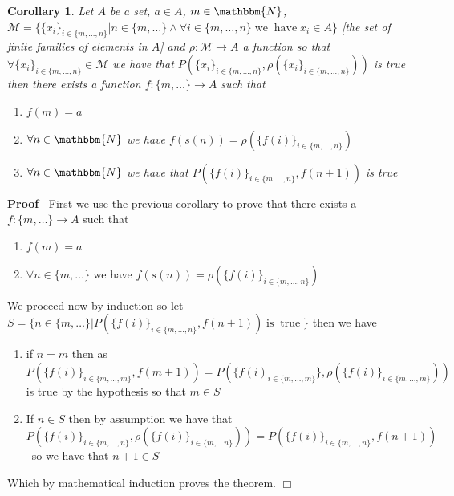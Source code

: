 \documentclass{book}
\newcommand{\tmop}[1]{\ensuremath{\operatorname{#1}}}
\newenvironment{proof}{\noindent\textbf{Proof\ }}{\hspace*{\fill}$\Box$\medskip}
\newtheorem{corollary}{Corollary}
\begin{document}
{{\begin{corollary}
  \label{recursion restricted sequence}Let $A$ be a set, $a \in A$, $m \in
  \mathbbm{N}$, $\mathcal{M}= \{ \{ x_i \}_{i \in \{ m, \ldots, n \}} |n \in
  \{ m, \ldots \} \wedge \forall i \in \{ m, \ldots, n \} \tmop{we}
  \tmop{have} x_i \in A \}$ [the set of finite families of elements in $A$]
  and $\rho : \mathcal{M} \rightarrow A$ a function so that $\forall \{ x_i
  \}_{i \in \{ m, \ldots, n \}} \in \mathcal{M}$ we have that $P (\{ x_i \}_{i
  \in \{ m, \ldots, n \}}, \rho (\{ x_i \}_{i \in \{ m, \ldots, n \}}))$ is
  true then there exists a function $f : \{ m, \ldots \} \rightarrow A$ such
  that
  \begin{enumerate}
    \item $f (m) = a$
    
    \item $\forall n \in \mathbbm{N}$ we have $f (s (n)) = \rho (\{ f (i)
    \}_{i \in \{ m, \ldots, n \}})$
    
    \item $\forall n \in \mathbbm{N}$ we have that $P (\{ f (i) \}_{i \in \{
    m, \ldots, n \}}, f (n + 1))$ is true
  \end{enumerate}
\end{corollary}

\begin{proof}
  First we use the previous corollary to prove that there exists a $f : \{ m,
  \ldots \} \rightarrow A$ such that
  \begin{enumerate}
    \item $f (m) = a$
    
    \item $\forall n \in \{ m, \ldots \}$ we have $f (s (n)) = \rho (\{ f (i)
    \}_{i \in \{ m, \ldots, n \}})$
  \end{enumerate}
  We proceed now by induction so let $S = \{ n \in \{ m, \ldots \} |P (\{ f
  (i) \}_{i \in \{ m, \ldots, n \}}, f (n + 1)) \tmop{is} \tmop{true} \}$ then
  we have
  \begin{enumerate}
    \item if $n = m$ then as $P (\{ f (i) \}_{i \in \{ m, \ldots, m \}}, f (m
    + 1)) = P (\{ f (i)_{i \in \{ m, \ldots, m \}} \}, \rho (\{ f (i) \}_{i
    \in \{ m, \ldots, m \}}))$ is true by the hypothesis so that $m \in S$
    
    \item If $n \in S$ then by assumption we have that $P (\{ f (i) \}_{i \in
    \{ m, \ldots, n \}}, \rho (\{ f (i) \}_{i \in \{ m, \ldots n \}})) = P (\{
    f (i) \}_{i \in \{ m, \ldots, n \}}, f (n + 1))$ \ so we have that $n + 1
    \in S$
  \end{enumerate}
  Which by mathematical induction proves the theorem.
\end{proof}

}}
\end{document}
